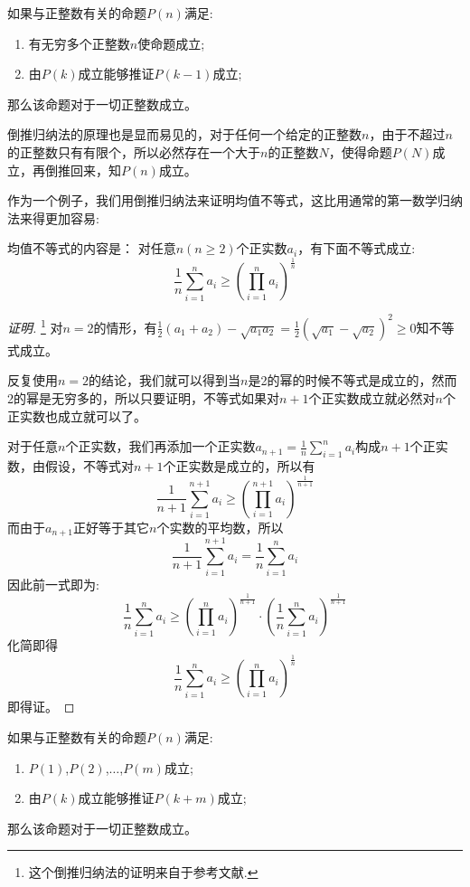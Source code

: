 \begin{principle}[倒推归纳法]
如果与正整数有关的命题$P(n)$满足:
  \begin{enumerate}
  \item 有无穷多个正整数$n$使命题成立;
  \item 由$P(k)$成立能够推证$P(k-1)$成立;
  \end{enumerate}
那么该命题对于一切正整数成立。
\end{principle}
倒推归纳法的原理也是显而易见的，对于任何一个给定的正整数$n$，由于不超过$n$的正整数只有有限个，所以必然存在一个大于$n$的正整数$N$，使得命题$P(N)$成立，再倒推回来，知$P(n)$成立。

\begin{example}[均值不等式]
作为一个例子，我们用倒推归纳法来证明均值不等式，这比用通常的第一数学归纳法来得更加容易:

  均值不等式的内容是： 对任意$n(n\geqslant2)$个正实数$a_i$，有下面不等式成立:
\[ \frac{1}{n}\sum_{i=1}^na_i \geqslant \left( \prod_{i=1}^na_i \right)^{\frac{1}{n}} \]

\begin{proof}[证明]\footnote{这个倒推归纳法的证明来自于参考文献\cite{the-secret-of-inequality}.}
  对$n=2$的情形，有$\frac{1}{2}(a_1+a_2)-\sqrt{a_1a_2}=\frac{1}{2}(\sqrt{a_1}-\sqrt{a_2})^2\geqslant 0$知不等式成立。

 反复使用$n=2$的结论，我们就可以得到当$n$是2的幂的时候不等式是成立的，然而2的幂是无穷多的，所以只要证明，不等式如果对$n+1$个正实数成立就必然对$n$个正实数也成立就可以了。

对于任意$n$个正实数，我们再添加一个正实数$a_{n+1}=\frac{1}{n}\sum_{i=1}^na_i$构成$n+1$个正实数，由假设，不等式对$n+1$个正实数是成立的，所以有
\[
\frac{1}{n+1}\sum_{i=1}^{n+1}a_i \geqslant \left( \prod_{i=1}^{n+1}a_i \right)^{\frac{1}{n+1}}
\]
而由于$a_{n+1}$正好等于其它$n$个实数的平均数，所以
\[ \frac{1}{n+1}\sum_{i=1}^{n+1}a_i = \frac{1}{n}\sum_{i=1}^{n}a_i \]
因此前一式即为:
\[
\frac{1}{n}\sum_{i=1}^{n}a_i \geqslant \left( \prod_{i=1}^{n}a_i \right)^{\frac{1}{n+1}} \cdot \left( \frac{1}{n}\sum_{i=1}^na_i \right)^{\frac{1}{n+1}}
\]
化简即得
\[
\frac{1}{n}\sum_{i=1}^na_i \geqslant \left( \prod_{i=1}^na_i \right)^{\frac{1}{n}} 
\]
即得证。
\end{proof}
\end{example}

\begin{principle}[跳跃数学归纳法]
  如果与正整数有关的命题$P(n)$满足:
  \begin{enumerate}
  \item $P(1)$,$P(2)$,$\ldots$,$P(m)$成立;
  \item 由$P(k)$成立能够推证$P(k+m)$成立;
  \end{enumerate}
那么该命题对于一切正整数成立。
\end{principle}

